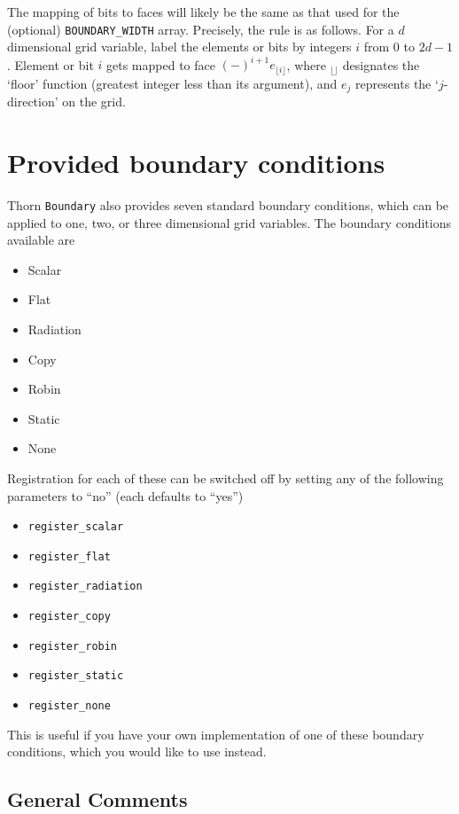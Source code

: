 \documentclass{article}
\begin{document}
The mapping of bits to faces will likely be the same as that used for
the (optional) \texttt{BOUNDARY\_WIDTH} array.  Precisely, the rule is as
follows.  For a $d$ dimensional grid variable, label the elements or
bits by integers $i$ from $0$ to $2d-1$. Element or bit $i$ gets
mapped to face $(-)^{i+1}e_{\lfloor i\rfloor}$, where ${}_{\lfloor
\rfloor}$ designates the `floor' function (greatest integer less than
its argument), and $e_j$ represents the `$j$-direction' on the grid.


\section{Provided boundary conditions}
\label{Boundary/sec:provided_bcs}
Thorn \texttt{Boundary} also provides seven standard boundary
conditions, which can be applied to one, two, or three dimensional
grid variables.  The boundary conditions available are
\begin{itemize}
\item Scalar
\item Flat 
\item Radiation 
\item Copy
\item Robin
\item Static
\item None
\end{itemize}

Registration for each of these can be switched off by setting any of
the following parameters to ``no'' (each defaults to ``yes'')
\begin{itemize}
\item \texttt{register\_scalar}
\item \texttt{register\_flat}
\item \texttt{register\_radiation}
\item \texttt{register\_copy}
\item \texttt{register\_robin}
\item \texttt{register\_static}
\item \texttt{register\_none}
\end{itemize}
This is useful if you have your own implementation of one of these
boundary conditions, which you would like to use instead.


\subsection{General Comments}
\end{document}

